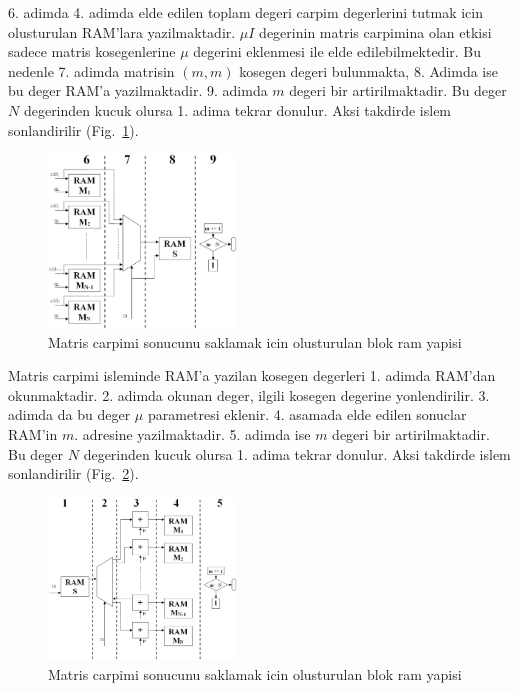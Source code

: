 \documentclass[]{interact}
\theoremstyle{plain}%
\theoremstyle{definition}
\theoremstyle{remark}
\begin{document}
6. adimda 4. adimda elde edilen toplam degeri carpim degerlerini tutmak icin olusturulan RAM’lara yazilmaktadir. $\mu I$  degerinin matris carpimina olan etkisi sadece matris kosegenlerine  $\mu$  degerini eklenmesi ile elde edilebilmektedir. Bu nedenle 7. adimda matrisin $(m,m)$   kosegen degeri bulunmakta, 8. Adimda ise bu deger RAM’a yazilmaktadir. 9. adimda  $m$  degeri bir artirilmaktadir. Bu deger $N$  degerinden kucuk olursa 1. adima tekrar donulur. Aksi takdirde islem sonlandirilir (Fig.~\ref{fig:multip_2}).

\begin{figure}[h]
  \centering
  \includegraphics[width=5cm]{multip_2}

  \caption{Matris carpimi sonucunu saklamak icin olusturulan blok ram yapisi}
  \label{fig:multip_2}
\end{figure}

Matris carpimi isleminde RAM’a yazilan kosegen degerleri 1. adimda RAM’dan okunmaktadir. 2. adimda okunan deger, ilgili kosegen degerine yonlendirilir. 3. adimda da bu deger $\mu$   parametresi eklenir. 4. asamada elde edilen sonuclar    RAM’in $m.$  adresine yazilmaktadir. 5. adimda ise $m$ degeri bir artirilmaktadir. Bu deger $N$  degerinden kucuk olursa 1. adima tekrar donulur. Aksi takdirde islem sonlandirilir (Fig.~\ref{fig:add_mu}).

\begin{figure}[h]
  \centering
  \includegraphics[width=5cm]{add_mu}

  \caption{Matris carpimi sonucunu saklamak icin olusturulan blok ram yapisi}
  \label{fig:add_mu}
\end{figure}
 
\end{document}
